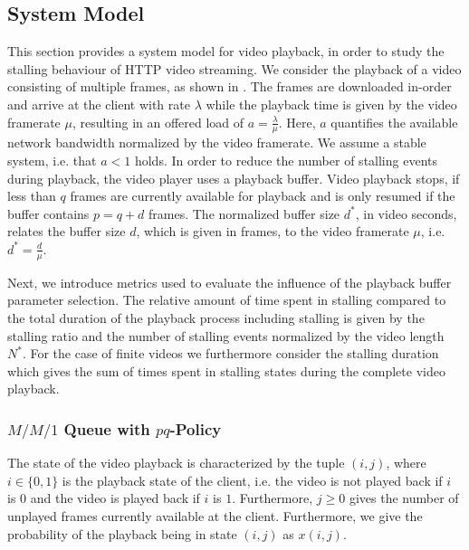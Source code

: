 \subsection{System Model}\label{sec:application:qoe_user_behaviour:system_model}
This section provides a system model for video playback, in order to study the stalling behaviour of \gls{HTTP} video streaming.
We consider the playback of a video consisting of multiple frames, as shown in .
The frames are downloaded in-order and arrive at the client with rate \(\lambda\) while the playback time is given by the video framerate \(\mu\), resulting in an offered load of \(a = \frac{\lambda}{\mu}\). Here, \(a\) quantifies the available network bandwidth normalized by the video framerate. We assume a stable system, i.e. that \(a < 1\) holds.
In order to reduce the number of stalling events during playback, the video player uses a playback buffer.
Video playback stops, if less than \(q\) frames are currently available for playback and is only resumed if the buffer contains \(p = q + d\) frames. 
The normalized buffer size \(d^*\), in video seconds, relates the buffer size \(d\), which is given in frames, to the video framerate \(\mu\), i.e. \(d^*=\frac{d}{\mu}\).

Next, we introduce metrics used to evaluate the influence of the playback buffer parameter selection.
The relative amount of time spent in stalling compared to the total duration of the playback process including stalling is given by the stalling ratio \stallingRatio and the number of stalling events normalized by the video length \(N^*\).
For the case of finite videos we furthermore consider the stalling duration \stallingDuration which gives the sum of times spent in stalling states during the complete video playback. 


\subsubsection*{\(M/M/1\) Queue with \(pq\)-Policy}\label{sec:application:qoe_user_behaviour:system_model:mm1pq}
The state of the video playback is characterized by the tuple \((i, j)\), where \(i \in \{0, 1\}\) is the playback state of the client, i.e. the video is not played back if \(i\) is \(0\) and the video is played back if \(i\) is \(1\).
Furthermore, \(j \geq 0\) gives the number of unplayed frames currently available at the client.
Furthermore, we give the probability of the playback being in state \((i, j)\) as \(x(i, j)\).

